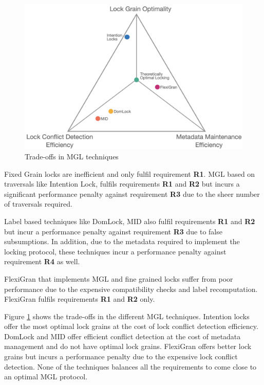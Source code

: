 \begin{figure}[h]
    \centering
    \captionsetup{justification=centering}
    \includegraphics[width=.9\textwidth]{figures/MGL_comparision.png}
    \caption{Trade-offs in MGL techniques}
    \label{fig:tradeoffs}
\end{figure}

Fixed Grain locks are inefficient and only fulfil requirement \textbf{R1}. MGL based on traversals like Intention Lock, fulfils requirements \textbf{R1} and \textbf{R2} but incurs a significant performance penalty against requirement \textbf{R3} due to the sheer number of traversals required. 

Label based techniques like DomLock, MID also fulfil requirements \textbf{R1} and \textbf{R2} but incur a performance penalty against requirement \textbf{R3} due to false subsumptions. In addition, due to the metadata required to implement the locking protocol, these techniques incur a performance penalty against requirement \textbf{R4} as well. 

FlexiGran that implements MGL and fine grained locks suffer from poor performance due to the expensive compatibility checks and label recomputation. FlexiGran fulfils requirements \textbf{R1} and \textbf{R2} only. 

Figure \ref{fig:tradeoffs} shows the trade-offs in the different MGL techniques. Intention locks offer the most optimal lock grains at the cost of lock conflict detection efficiency. DomLock and MID offer efficient conflict detection at the cost of metadata management and do not have optimal lock grains. FlexiGran offers better lock grains but incurs a performance penalty due to the expensive lock conflict detection. None of the techniques balances all the requirements to come close to an optimal MGL protocol.

